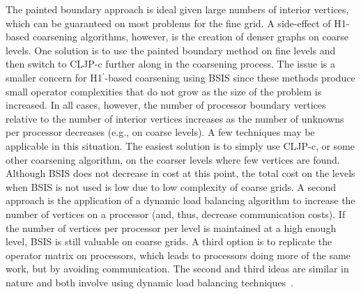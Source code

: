 \documentclass{elsart}
\begin{document}
The painted boundary approach is ideal given large numbers of interior
vertices, which can be guaranteed on most problems for the fine grid.
A side-effect of H1-based coarsening algorithms, however, is the
creation of denser graphs on coarse levels. One solution is to use the
painted boundary method on fine levels and then switch to CLJP-c
further along in the coarsening process. The issue is a smaller
concern for H1$^\prime$-based coarsening using BSIS since these
methods produce small operator complexities that do not grow as the
size of the problem is increased. In all cases, however, the number of
processor boundary vertices relative to the number of interior
vertices increases as the number of unknowns per processor decreases
(e.g., on coarse levels). A few techniques may be applicable in this
situation. The easiest solution is to simply use CLJP-c, or some other
coarsening algorithm, on the coarser levels where few vertices are
found. Although BSIS does not decrease in cost at this point, the
total cost on the levels when BSIS is not used is low due to low
complexity of coarse grids. A second approach is the application of a
dynamic load balancing algorithm to increase the number of vertices on
a processor (and, thus, decrease communication costs). If the number
of vertices per processor per level is maintained at a high enough
level, BSIS is still valuable on coarse grids. A third option is to
replicate the operator matrix on processors, which leads to processors
doing more of the same work, but by avoiding communication. The second
and third ideas are similar in nature and both involve using dynamic
load balancing
techniques~\cite{DevineBomanKarypisPP04,CybDLB,deCoughnyLB,SchloegelLB,ZoltanParHyp06ipdps,ZoltanParHypRepart07}.



\end{document}
